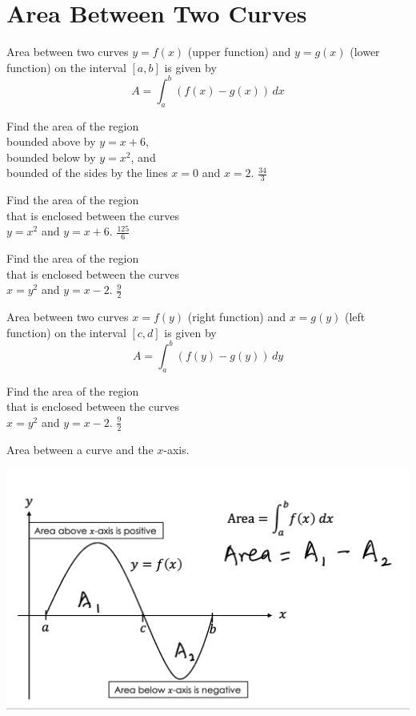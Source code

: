 
\section{Area Between Two Curves}

\begin{myframe}[arc=10pt,auto outer arc]
Area between two curves $y=f(x)$ (upper function) and $y=g(x)$ (lower function) on the interval $[a, b]$ is given by
\[
A = \int_a^b \left(f(x) - g(x)\right) \, dx
\]
\end{myframe}

\problemans%
{Find the area of the region\\
bounded above by $y = x + 6$,\\
bounded below by $y=x^2$, and \\
bounded of the sides by the lines $x=0$ and $x=2$.}
{$\frac{34}{3}$}%

\problemans%
{Find the area of the region\\
that is enclosed between the curves\\
$y=x^2$ and $y=x+6$.}%
{$\displaystyle \frac{125}{6}$}%

\newpage

\problemans%
{Find the area of the region\\
that is enclosed between the curves\\
$x=y^2$ and $y=x-2$.
}%
{$\displaystyle \frac{9}{2}$}%

\makenewpage
\begin{myframe}[arc=10pt,auto outer arc]
Area between two curves $x=f(y)$ (right function) and $x=g(y)$ (left function) on the interval $[c, d]$ is given by
\[
A = \int_a^b \left(f(y) - g(y)\right) \, dy
\]
\end{myframe}

\problemans%
{Find the area of the region\\
that is enclosed between the curves\\
$x=y^2$ and $y=x-2$.
}%
{$\frac{9}{2}$}%


\makenewpage

\begin{myframe}[arc=10pt,auto outer arc]
	\noindent Area between a curve and the $x$-axis.
	
	\includegraphics[width=0.7\linewidth]{chapter5/area}
\end{myframe}


